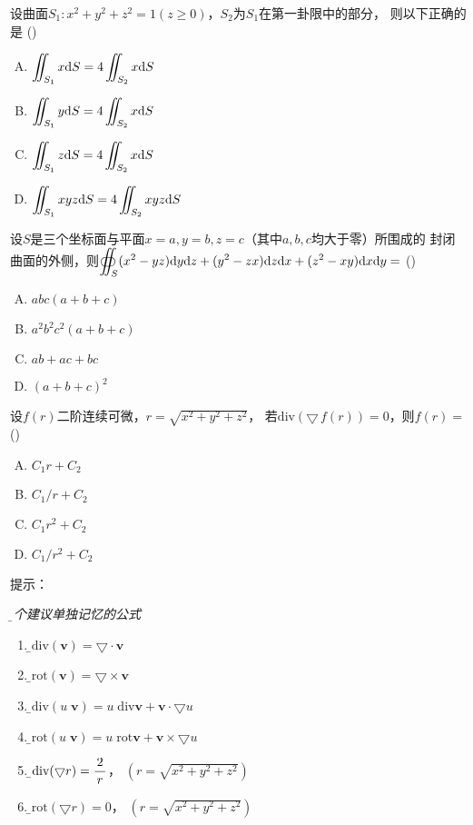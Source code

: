 \begin{frame}
	\linespread{1.5}
	设曲面$S_1:x^2+y^2+z^2=1(z\geq
	  0)$，$S_2$为$S_1$在第一卦限中的部分，
	  则以下正确的是
	(\underline{\;})
	\begin{enumerate}[(A)]
	  \item $\displaystyle\iint_{S_1}x\mathrm{d} S=4\iint_{S_2}x\mathrm{d} S$
	  \item $\displaystyle\iint_{S_1}y\mathrm{d} S=4\iint_{S_2}x\mathrm{d} S$
	  \item $\displaystyle\iint_{S_1}z\mathrm{d} S=4\iint_{S_2}x\mathrm{d} S$
	  \item $\displaystyle\iint_{S_1}xyz\mathrm{d} S=4\iint_{S_2}xyz\mathrm{d} S$
	\end{enumerate}
\end{frame}

\begin{frame}
	\linespread{1.5}
	设$S$是三个坐标面与平面$x=a,y=b,z=c$（其中$a,b,c$均大于零）所围成的
    封闭曲面的外侧，则$\displaystyle\oiint_S(x^2-yz)\mathrm{d} y\mathrm{d} z+(y^2-zx)\mathrm{d} z\mathrm{d} x
    +(z^2-xy)\mathrm{d} x\mathrm{d} y=$
	(\underline{\;})
	\begin{enumerate}[(A)]
	  \item $abc(a+b+c)$
      \item $a^2b^2c^2(a+b+c)$
      \item $ab+ac+bc$
      \item $(a+b+c)^2$
	\end{enumerate}
\end{frame}

\begin{frame}
	\linespread{1.5}
	设$f(r)$二阶连续可微，$r=\sqrt{x^2+y^2+z^2}$，
  	若$\mathrm{div}(\bigtriangledown\,f(r))=0$，则$f(r)=$
	(\underline{\;})
	\begin{enumerate}[(A)]
	  \item $C_1r+C_2$
      \item $C_1/r+C_2$
      \item $C_1r^2+C_2$
      \item $C_1/r^2+C_2$
	\end{enumerate}
\end{frame}

\begin{frame}
	\linespread{1.2}
	\alert{提示：}{\it\b 几个建议单独记忆的公式 
	\begin{enumerate}[(1)]
	  \item \b$\mathrm{div}(\bm{v})=\bigtriangledown\cdot\bm{v}$
	  \item \b$\mathrm{rot}(\bm{v})=\bigtriangledown\times\bm{v}$
	  \item \b$\mathrm{div}(u\;\bm{v})=u\;\mathrm{div}\bm{v}
	  +\bm{v}\cdot\bigtriangledown u$
	  \item \b$\mathrm{rot}(u\;\bm{v})=u\;\mathrm{rot}\bm{v}
	  +\bm{v}\times\bigtriangledown u$
	  \item \b$\mathrm{div}(\bigtriangledown r)=\displaystyle\frac{\,{2}\,}{\,{r}\,}$，
	  \hspace{1cm} $(r=\sqrt{x^2+y^2+z^2})$
	  \item \b$\mathrm{rot}(\bigtriangledown r)=0$，
	  \hspace{1cm} $(r=\sqrt{x^2+y^2+z^2})$
	\end{enumerate}
	}
\end{frame}

